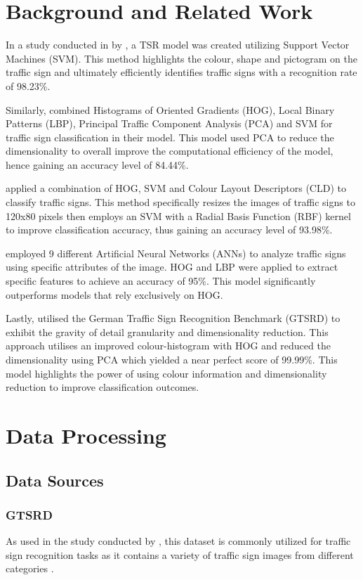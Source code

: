 \documentclass{article} %
\begin{document}
\section{Background and Related Work}
\label{headings}
In a study conducted in \citeyear{Madani} by \citeauthor{Madani}, a TSR model was created utilizing Support Vector Machines (SVM). This method highlights the colour, shape and pictogram on the traffic sign and ultimately efficiently identifies traffic signs with a recognition rate of 98.23\%. 

Similarly, \citet{soni2019improving} combined Histograms of Oriented Gradients (HOG), Local Binary Patterns (LBP), Principal Traffic Component Analysis (PCA) and SVM for traffic sign classification in their model. This model used PCA to reduce the dimensionality to overall improve the computational efficiency of the model, hence gaining an accuracy level of 84.44\%. 

\citet{Namyang} applied a combination of HOG, SVM and Colour Layout Descriptors (CLD) to classify traffic signs. This method specifically resizes the images of traffic signs to 120x80 pixels then employs an SVM with a Radial Basis Function (RBF) kernel to improve classification accuracy, thus gaining an accuracy level of 93.98\%. 

\citet{kerim} employed 9 different Artificial Neural Networks (ANNs) to analyze traffic signs using specific attributes of the image. HOG and LBP were applied to extract specific features to achieve an accuracy of 95\%. This model significantly outperforms models that rely exclusively on HOG. 

Lastly, \citet{li} utilised the German Traffic Sign Recognition Benchmark (GTSRD) to exhibit the gravity of detail granularity and dimensionality reduction. This approach utilises an improved colour-histogram with HOG and reduced the dimensionality using PCA which yielded a near perfect score of 99.99\%. This model highlights the power of using colour information and dimensionality reduction to improve classification outcomes. 

\section{Data Processing}
\subsection{Data Sources}
\subsubsection*{GTSRD}
As used in the study conducted by \citet{li}, this dataset is commonly utilized for traffic sign recognition tasks as it contains a variety of traffic sign images from different categories \citep{stallkamp2011gtsrb}.
\end{document}
